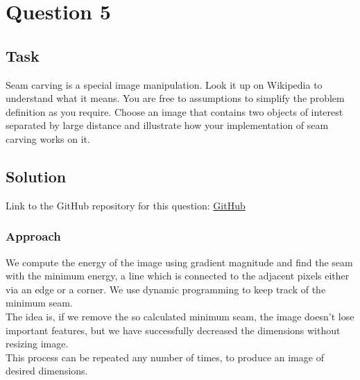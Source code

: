 \section{Question 5}

\subsection{Task}
Seam carving is a special image manipulation. Look it up on Wikipedia to understand what it means. You are free to assumptions to simplify the problem definition as you require. Choose an image that contains two objects of interest separated by large distance and illustrate how your implementation of seam carving works on it.


\subsection{Solution}

Link to the GitHub repository for this question: \href{https://github.com/Xerefic/MM2090-Solutions/tree/master/Final_Assignment/question_5}{GitHub}

\subsubsection{Approach}
We compute the energy of the image using gradient magnitude and find the seam with the minimum energy, a line which is connected to the adjacent pixels either via an edge or a corner. We use dynamic programming to keep track of the minimum seam. \\
The idea is, if we remove the so calculated minimum seam, the image doesn’t lose important features, but we have successfully decreased the dimensions without resizing image.\\
This process can be repeated any number of times, to produce an image of desired dimensions.

